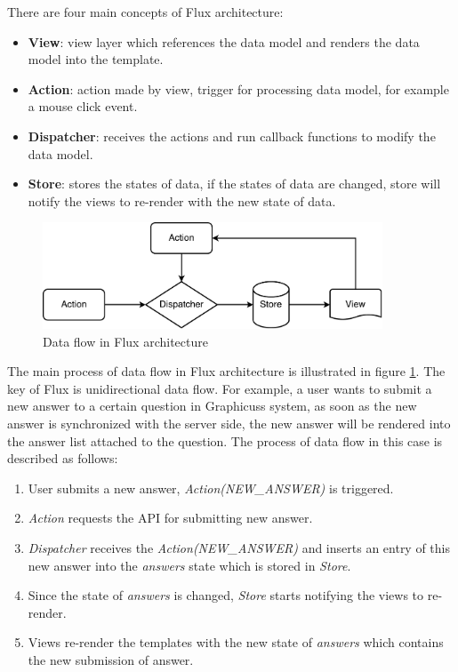 There are four main concepts of Flux architecture: 
\begin{itemize}
  \item 
  \textbf{View}: view layer which references the data model and renders the data model into the template.
  \item 
  \textbf{Action}: action made by view, trigger for processing data model, for example a mouse click event.
  \item 
  \textbf{Dispatcher}: receives the actions and run callback functions to modify the data model.
  \item 
  \textbf{Store}: stores the states of data, if the states of data are changed, store will notify the views to re-render with the new state of data.
\end{itemize}

\begin{figure}[!htbp]
  \centering
    \includegraphics[width=0.9\textwidth]{Figures/imp-flux-arch.pdf}
  \caption{Data flow in Flux architecture}
  \label{fig:flux-arch-imp}
\end{figure}

The main process of data flow in Flux architecture is illustrated in figure \ref{fig:flux-arch-imp}. The key of Flux is unidirectional data flow. For example, a user wants to submit a new answer to a certain question in Graphicuss system, as soon as the new answer is synchronized with the server side, the new answer will be rendered into the answer list attached to the question. The process of data flow in this case is described as follows:
\begin{enumerate}
  \item 
  User submits a new answer, \textit{Action(NEW\_ANSWER)} is triggered.
  \item 
  \textit{Action} requests the API for submitting new answer.
  \item 
  \textit{Dispatcher} receives the \textit{Action(NEW\_ANSWER)} and inserts an entry of this new answer into the \textit{answers} state which is stored in \textit{Store}.
  \item 
  Since the state of \textit{answers} is changed, \textit{Store} starts notifying the views to re-render.
  \item 
  Views re-render the templates with the new state of \textit{answers} which contains the new submission of answer.
\end{enumerate}


